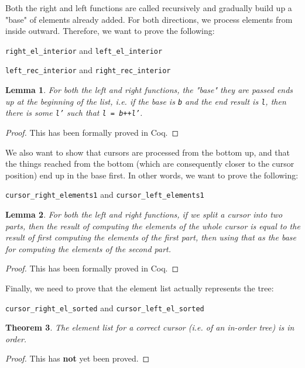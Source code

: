 \documentclass[12pt]{article}
\newtheorem{theorem}{Theorem}
\newtheorem{lemma}[theorem]{Lemma}
\begin{document}
Both the right and left functions are called recursively and gradually build up a "base" of elements already added. For both directions, we process elements from inside outward. Therefore, we want to prove the following:

\bigskip
\texttt{right\_el\_interior} and \texttt{left\_el\_interior}

\texttt{left\_rec\_interior} and \texttt{right\_rec\_interior}

\begin{lemma}
For both the left and right functions, the "base" they are passed ends up at the beginning of the list, i.e. if the base is \texttt{b} and the end result is \texttt{l}, then there is some \texttt{l'} such that \texttt{l = b++l'}.
\end{lemma}

\begin{proof}
This has been formally proved in Coq.
\end{proof}

We also want to show that cursors are processed from the bottom up, and that the things reached from the bottom (which are consequently closer to the cursor position) end up in the base first. In other words, we want to prove the following:

\bigskip
\texttt{cursor\_right\_elements1} and \texttt{cursor\_left\_elements1}

\begin{lemma}
For both the left and right functions, if we split a cursor into two parts, then the result of computing the elements of the whole cursor is equal to the result of first computing the elements of the first part, then using that as the base for computing the elements of the second part.
\end{lemma}

\begin{proof}
This has been formally proved in Coq.
\end{proof}

Finally, we need to prove that the element list actually represents the tree:

\bigskip
\texttt{cursor\_right\_el\_sorted} and \texttt{cursor\_left\_el\_sorted}

\begin{theorem}
The element list for a correct cursor (i.e. of an in-order tree) is in order.
\end{theorem}

\begin{proof}
This has \textbf{not} yet been proved.
\end{proof}
\end{document}

